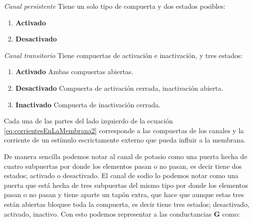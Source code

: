 \begin{definition}
 \emph{Canal persistente} Tiene un solo tipo de compuerta y dos estados posibles:
 \begin{enumerate}
  \item \textbf{Activado}
  \item \textbf{Desactivado}
 \end{enumerate}

\end{definition}

\begin{definition}
 \emph{Canal transitorio} Tiene compuertas de activación e inactivación, y tres estados:
 \begin{enumerate}
  \item \textbf{Activado} Ambas compuertas abiertas.
  \item \textbf{Desactivado} Compuerta de activación cerrada, inactivación abierta.
  \item \textbf{Inactivado} Compuerta de inactivación cerrada.
 \end{enumerate}

\end{definition}




Cada una de las partes del lado izquierdo de la ecuación \ref{eq:corrientesEnLaMembrana2} corresponde a las compuertas de los canales y la corriente de un estímulo escrictamente externo que pueda influir a la membrana.

De manera sencilla podemos notar al canal de potasio como una puerta hecha de cuatro subpuertas por donde los elementos pasan o no pasan, es decir tiene dos estados; activado o desactivado. El canal de sodio lo podemos notar como una puerta que está hecha de tres subpuertas del mismo tipo por donde los elementos pasan o no pasan y tiene aparte un tapón extra, que hace que aunque estas tres están abiertas bloquee toda la compuerta, es decir tiene tres estados; desactivado, activado, inactivo. Con esto podemos representar a las conductancias \textbf{G} como:

